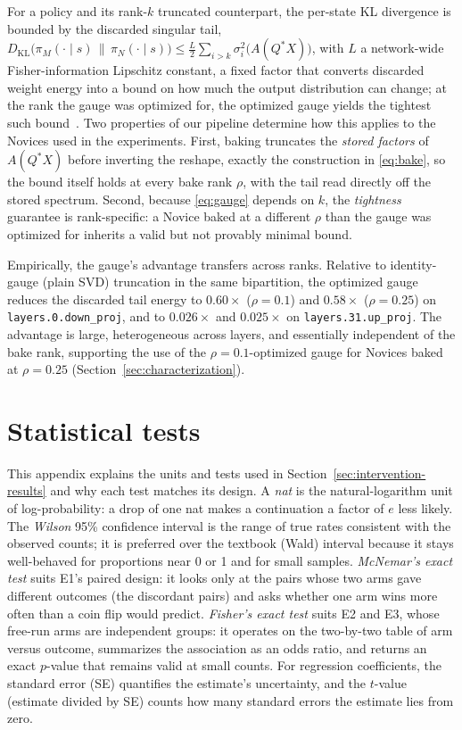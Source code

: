 \documentclass[9pt]{article}
\begin{document}
For a policy and its rank-$k$ truncated counterpart, the per-state KL
divergence is bounded by the discarded singular tail,
$D_{\mathrm{KL}}\bigl(\pi_M(\cdot \mid s)\,\|\,\pi_N(\cdot \mid s)\bigr)
\le \tfrac{L}{2} \sum_{i>k} \sigma_i^2\bigl(A(Q^{*}X)\bigr)$, with $L$ a
network-wide Fisher-information Lipschitz constant, a fixed factor that
converts discarded weight energy into a bound on how much the output
distribution can change; at the rank the gauge was optimized for, the
optimized gauge yields the tightest such
bound~\citep{till2026introspection}. Two properties of our pipeline
determine how this applies to the Novices used in the experiments. First,
baking truncates the \emph{stored factors} of $A(Q^{*}X)$ before inverting
the reshape, exactly the construction in \eqref{eq:bake}, so the bound
itself holds at every bake rank $\rho$, with the tail read directly off the
stored spectrum. Second, because \eqref{eq:gauge} depends on $k$, the
\emph{tightness} guarantee is rank-specific: a Novice baked at a different
$\rho$ than the gauge was optimized for inherits a valid but not provably
minimal bound.

Empirically, the gauge's advantage transfers across ranks. Relative to
identity-gauge (plain SVD) truncation in the same bipartition,
the optimized gauge reduces the discarded tail energy to $0.60\times$
($\rho{=}0.1$) and $0.58\times$ ($\rho{=}0.25$) on
\texttt{layers.0.down\_proj}, and to $0.026\times$ and $0.025\times$ on
\texttt{layers.31.up\_proj}. The advantage is large, heterogeneous across
layers, and essentially independent of the bake rank, supporting the use of
the $\rho{=}0.1$-optimized gauge for Novices baked at $\rho{=}0.25$
(Section~\ref{sec:characterization}).

\section{Statistical tests}\label{app:stats}

This appendix explains the units and tests used in
Section~\ref{sec:intervention-results} and why each test matches its design.
A \emph{nat} is the natural-logarithm unit of log-probability: a drop of one
nat makes a continuation a factor of $e$ less likely. The \emph{Wilson} 95\% confidence interval is
the range of true rates consistent with the observed counts; it is preferred
over the textbook (Wald) interval because it stays well-behaved for
proportions near 0 or 1 and for small samples. \emph{McNemar's exact test}
suits E1's paired design: it looks only at the pairs whose two arms gave
different outcomes (the discordant pairs) and asks whether one arm wins more
often than a coin flip would predict. \emph{Fisher's exact test} suits E2 and
E3, whose free-run arms are independent groups: it operates on the two-by-two
table of arm versus outcome, summarizes the association as an odds ratio, and
returns an exact $p$-value that remains valid at small counts. For regression
coefficients, the standard error (SE) quantifies the estimate's uncertainty,
and the $t$-value (estimate divided by SE) counts how many standard errors
the estimate lies from zero.
\end{document}
